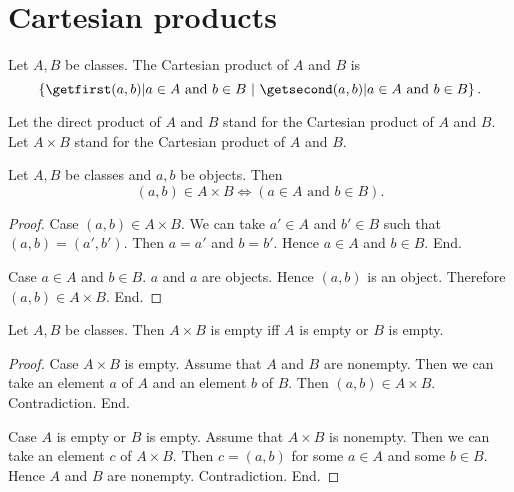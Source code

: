 \documentclass[../../set-theory/set-theory.tex]{subfiles}
\begin{document}
  \section{Cartesian products}

  \begin{forthel}
    \begin{definition}
      Let $A, B$ be classes.
      The Cartesian product of $A$ and $B$ is
      \[ \class{ (a, b) | \text{$a \in A$ and $b \in B$} }. \]
    \end{definition}

    Let the direct product of $A$ and $B$ stand for  the Cartesian product of
    $A$ and $B$.
    Let $A \times B$ stand for the Cartesian product of $A$ and $B$.
  \end{forthel}

  \begin{forthel}
    \begin{proposition}
      Let $A, B$ be classes and $a, b$ be objects.
      Then \[ (a, b) \in A \times B \iff (\text{$a \in A$ and $b \in B$}). \]
    \end{proposition}
    \begin{proof}
      Case $(a, b) \in A \times B$.
        We can take $a' \in A$ and $b' \in B$ such that $(a, b) = (a', b')$.
        Then $a = a'$ and $b = b'$.
        Hence $a \in A$ and $b \in B$.
      End.

      Case $a \in A$ and $b \in B$.
        $a$ and $a$ are objects.
        Hence $(a, b)$ is an object.
        Therefore $(a, b) \in A \times B$.
      End.
    \end{proof}
  \end{forthel}

  \begin{forthel}
    \begin{proposition}
      Let $A, B$ be classes.
      Then $A \times B$ is empty iff $A$ is empty or $B$ is empty.
    \end{proposition}
    \begin{proof}
      Case $A \times B$ is empty.
        Assume that $A$ and $B$ are nonempty.
        Then we can take an element $a$ of $A$ and an element $b$ of $B$.
        Then $(a, b) \in A \times B$.
        Contradiction.
      End.

      Case $A$ is empty or $B$ is empty.
        Assume that $A \times B$ is nonempty.
        Then we can take an element $c$ of $A \times B$.
        Then $c = (a, b)$ for some $a \in A$ and some $b \in B$.
        Hence $A$ and $B$ are nonempty.
        Contradiction.
      End.
    \end{proof}
  \end{forthel}
\end{document}
